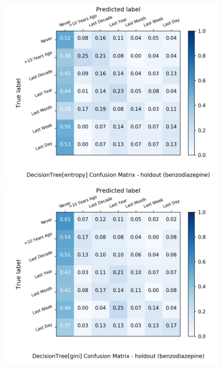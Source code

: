 \begin{figure}[H]
	\centering
	\begin{minipage}[b]{0.32\textwidth}
		\includegraphics[width=1.1\textwidth]{Plots/benzodiazepine_DecisionTree_entropy_balance_False_holdout.png}
	\end{minipage}
	\begin{minipage}[b]{0.32\textwidth}
		\includegraphics[width=1.1\textwidth]{Plots/benzodiazepine_DecisionTree_gini_balance_False_holdout.png}
	\end{minipage}

\end{figure}
